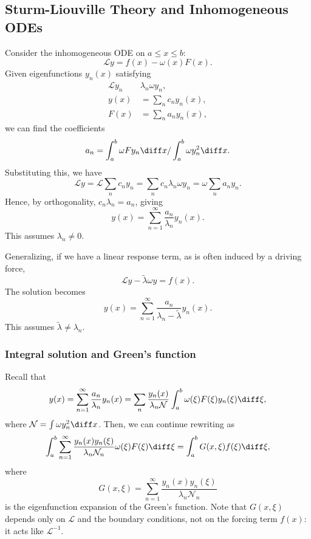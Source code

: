 \documentclass[12pt]{article}
\begin{document}
\subsection{Sturm-Liouville Theory and Inhomogeneous ODEs}%
\label{sub:sturm_liouville_theory_and_inhomogeneous_odes}

Consider the inhomogeneous ODE on $a \leq x \leq b$:
\[
	\mathcal{L}y = f(x) - \omega(x) F(x)
.\]
Given eigenfunctions $y_n(x)$ satisfying
\begin{align*}
	\mathcal{L}y_n & \lambda_n \omega y_n, \\
	y(x) &= \sum_{n} c_n y_n(x), \\
	F(x) &= \sum_{n}a_n y_n(x),
\end{align*}
we can find the coefficients
\[
a_n = \int_{a}^{b} \omega F y_n \diff x / \int_{a}^{b} \omega y_n^2\diff x
.\]
Substituting this, we have
\[
\mathcal{L}y = \mathcal{L}\sum_{n}c_n y_n = \sum_{n} c_n \lambda_n \omega y_n = \omega \sum_{n} a_n y_n
.\]
Hence, by orthogonality, $c_n \lambda_n = a_n$, giving
\[
	y(x) = \sum_{n = 1}^{\infty} \frac{a_n}{\lambda_n} y_n(x)
.\]
This assumes $\lambda_n \neq 0$.

Generalizing, if we have a linear response term, as is often induced by a driving force,
\[
	\mathcal{L}y - \tilde \lambda \omega y = f(x)
.\]
The solution becomes
\[
	y(x) = \sum_{n = 1}^{\infty} \frac{a_n}{\lambda_n - \tilde \lambda} y_n(x)
.\]
This assumes $\tilde \lambda \neq \lambda_n$.

\subsubsection{Integral solution and Green's function}%
\label{subsub:integral_solution_and_green_s_function}

Recall that
\[
	y(x) = \sum_{n = 1}^{\infty}\frac{a_n}{\lambda_n} y_n(x) = \sum_{n} \frac{y_n(x)}{\lambda_n \mathcal{N}} \int_{a}^{b} \omega(\xi) F(\xi) y_n(\xi)\diff \xi
,\]
where $\mathcal{N} = \int \omega y_n^2 \diff x$. Then, we can continue rewriting as
\[
	\int_{a}^{b} \sum_{n = 1}^{\infty} \frac{y_n(x) y_n(\xi)}{\lambda_n \mathcal{N}_n} \omega(\xi) F(\xi)\diff \xi = \int_{a}^{b}G(x, \xi) f(\xi)\diff \xi
,\]
where
\[
	G(x, \xi) = \sum_{n = 1}^{\infty} \frac{y_n(x) y_n(\xi)}{\lambda_n \mathcal{N}_n}
\]
is the eigenfunction expansion of the Green's function. Note that $G(x, \xi)$ depends only on $\mathcal{L}$ and the boundary conditions, not on the forcing term $f(x)$: it acts like $\mathcal{L}^{-1}$.
\end{document}
